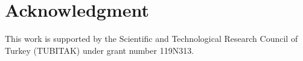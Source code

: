 \documentclass[conference,a4paper]{IEEEtran}[2015/08/26]
\begin{document}












%


\ifCLASSOPTIONcompsoc
\else
  \section*{Acknowledgment}
  This work is supported by the Scientific and Technological
  Research Council of Turkey (TUBITAK) under grant number
  119N313.
\fi





%

\end{document}
